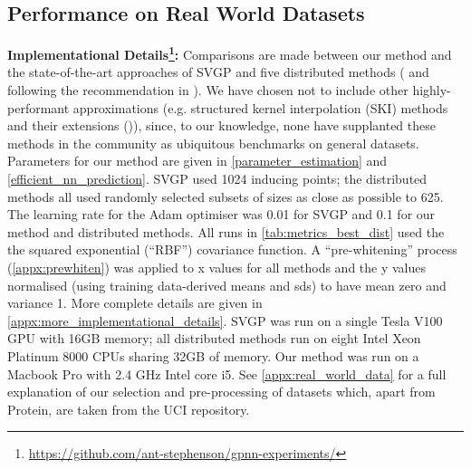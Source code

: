 \subsection{Performance on Real World Datasets}
\label{real_world_data}
\textbf {Implementational Details\footnote{\url{https://github.com/ant-stephenson/gpnn-experiments/}}:} Comparisons are made between our method and the state-of-the-art approaches of SVGP \cite{Hensman} and five distributed methods (\cite{hinton2002training,cao2014generalized,tresp2000bayesian,deisenroth2015distributed} and \cite{amalg_SOD} following the recommendation in \cite{Cohen20b}). We have chosen not to include other highly-performant approximations (e.g. structured kernel interpolation (SKI) methods and their extensions (\cite{Wilson2015,Yadav2021, Gardner2018a})), since, to our knowledge, none have supplanted these methods in the community as ubiquitous benchmarks on general datasets. Parameters for our method are given in \ref{parameter_estimation} and \ref{efficient_nn_prediction}. SVGP used 1024 inducing points; the distributed methods all used randomly selected subsets of sizes as close as possible to 625. The learning rate for the Adam optimiser was 0.01 for SVGP and 0.1 for our method and distributed methods. All runs in \autoref{tab:metrics_best_dist} used the the squared exponential (``RBF'') covariance function. A ``pre-whitening'' process (\ref{appx:prewhiten}) was applied to x values for all methods and the y values normalised (using training data-derived means and sds) to have mean zero and variance 1. More complete details are given in \ref{appx:more_implementational_details}. SVGP was run on a single Tesla V100 GPU with 16GB memory; all distributed methods run on eight Intel Xeon Platinum 8000 CPUs sharing 32GB of memory. Our method was run on a Macbook Pro with 2.4 GHz Intel core i5. See \ref{appx:real_world_data} for a full explanation of our selection and pre-processing of datasets which, apart from Protein, are taken from the UCI repository.

